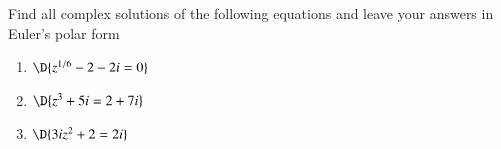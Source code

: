 \documentclass[11pt]{article}
\begin{document}
\vspace{0.2cm}

Find all complex solutions of the following equations and leave your answers in Euler's polar form
\begin{enumerate}
	\item[6.] $\D{z^{1/6}-2-2i = 0}$
	\item[7.] $\D{z^3 + 5i = 2+7i}$
	\item[8.] $\D{3iz^2 + 2 = 2i}$
\end{enumerate}
\end{document}

